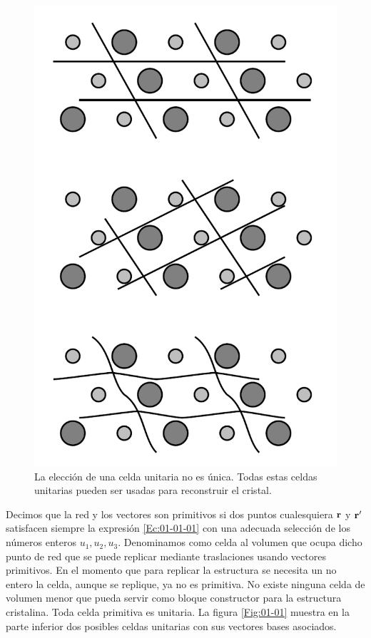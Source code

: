 \begin{figure}[h!] \centering
	\includegraphics[scale=0.4]{Cuerpo/Ch_01/Celda_unitaria.png}
	\caption{La elección de una celda unitaria no es única. Todas estas celdas unitarias pueden ser usadas para reconstruir el cristal.}
	\label{Fig:01-001}
\end{figure}

\begin{definition}
    Decimos que la red y los vectores son primitivos si dos puntos cualesquiera $\mathbf{r}$ y $\mathbf{r}'$ satisfacen siempre la expresión \ref{Ec:01-01-01} con una adecuada selección de los números enteros $u_1,u_2,u_3$. Denominamos como celda al volumen que ocupa dicho punto de red que se puede replicar mediante traslaciones usando vectores primitivos. En el momento que para replicar la estructura se necesita un no entero la celda, aunque se replique, ya no es primitiva. No existe ninguna celda de volumen menor que pueda servir como bloque constructor para la estructura cristalina. Toda celda primitiva es unitaria. La figura \ref{Fig:01-01} muestra en la parte inferior dos posibles celdas unitarias con sus vectores bases asociados.   
\end{definition}

